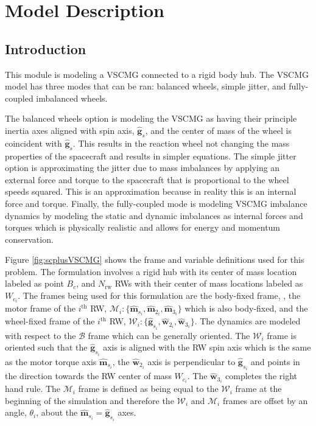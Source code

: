 \section{Model Description}

\subsection{Introduction}

This module is modeling a VSCMG connected to a rigid body hub. The VSCMG model has three modes that can be ran: balanced wheels, simple jitter, and fully-coupled imbalanced wheels.

The balanced wheels option is modeling the VSCMG as having their principle inertia axes aligned with spin axis, $\hat{\bm g}_s$, and the center of mass of the wheel is coincident with $\hat{\bm g}_s$. This results in the reaction wheel not changing the mass properties of the spacecraft and results in simpler equations. The simple jitter option is approximating the jitter due to mass imbalances by applying an external force and torque to the spacecraft that is proportional to the wheel speeds squared. This is an approximation because in reality this is an internal force and torque. Finally, the fully-coupled mode is modeling VSCMG imbalance dynamics by modeling the static and dynamic imbalances as internal forces and torques which is physically realistic and allows for energy and momentum conservation.

Figure \ref{fig:scplusVSCMG} shows the frame and variable definitions used for this problem. The formulation involves a rigid hub with its center of mass location labeled as point $B_c$, and $N_\text{rw}$ RWs with their center of mass locations labeled as $W_{c_i}$. The frames being used for this formulation are the body-fixed frame, , the motor frame of the $i^\text{th}$ RW, $\mathcal{M}_i:\{\hat{\bm m}_{s_i},\hat{\bm m}_{2_i},\hat{\bm m}_{3_i}\}$ which is also body-fixed, and the wheel-fixed frame of the $i^\text{th}$ RW, $\mathcal{W}_i:\{\hat{\bm g}_{s_i},\hat{\bm w}_{2_i},\hat{\bm w}_{3_i}\}$. The dynamics are modeled with respect to the $\mathcal{B}$ frame which can be generally oriented. The $\mathcal{W}_i$ frame is oriented such that the $\hat{\bm g}_{s_i}$ axis is aligned with the RW spin axis  which is the same as the motor torque axis $\hat{\bm m}_{s_{i}}$, the $\hat{\bm w}_{2_i}$ axis is perpendicular to $\hat{\bm g}_{s_i}$ and points in the direction towards the RW center of mass $W_{c_i}$. The $\hat{\bm w}_{3_i}$ completes the right hand rule. The $\mathcal{M}_i$ frame is defined as being equal to the $\mathcal{W}_i$ frame at the beginning of the simulation and therefore the $\mathcal{W}_i$ and $\mathcal{M}_i$ frames are offset by an angle, $\theta_i$, about the $\hat{\bm m}_{s_i} = \hat{\bm g}_{s_i}$ axes.
	
